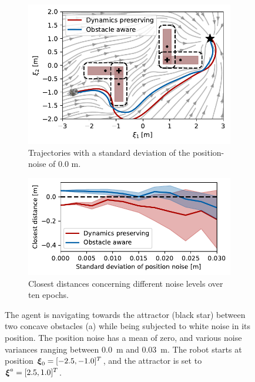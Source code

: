 \begin{figure}
    \centering
    \begin{subfigure}{\columnwidth}
      \centerline{\includegraphics[width=\textwidth]{figures/trajectory_position_noise}}
      \caption{Trajectories with a standard deviation of the position-noise of 0.0 m.}
      \label{fig:trajectory_position_noise}
    \end{subfigure}
    \begin{subfigure}{\columnwidth}
    \includegraphics[width=\textwidth]{figures/comparison_position_noise}
      \caption{Closest distances concerning different noise levels over ten epochs.}
      \label{fig:comparison_position_noise}
    \end{subfigure}
	\caption{
 The agent is navigating towards the attractor (black star) between two concave obstacles (a) while being subjected to white noise in its position. The position noise has a mean of zero, and various noise variances ranging between \qty{0.0}{m} and \qty{0.03}{m}. The robot starts at position $\boldsymbol{\xi}_0 = [-2.5, -1.0]^T$, and the attractor is set to $\boldsymbol{\xi}^a = [2.5, 1.0]^T$.
 }
\label{fig:position_noise}
\end{figure}


